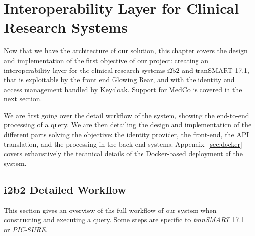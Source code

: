 
\chapter{Interoperability Layer for Clinical Research Systems}
\label{sec:interoplayer}

Now that we have the architecture of our solution, this chapter covers the design and implementation of the first objective of our project: creating an interoperability layer for the clinical research systems i2b2 and tranSMART 17.1, that is exploitable by the front end Glowing Bear, and with the identity and access management handled by Keycloak.
Support for MedCo is covered in the next section.

We are first going over the detail workflow of the system, showing the end-to-end processing of a query.
We are then detailing the design and implementation of the different parts solving the objective: the identity provider, the front-end, the API translation, and the processing in the back end systems.
Appendix~\ref{sec:docker} covers exhaustively the technical details of the Docker-based deployment of the system.


\section{i2b2 Detailed Workflow}
\label{sec:interoplayer-wf}

This section gives an overview of the full workflow of our system when constructing and executing a query.
Some steps are specific to \textit{tranSMART} 17.1 or \textit{PIC-SURE}.

